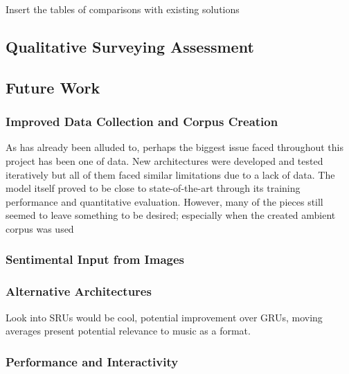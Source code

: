 \documentclass[12pt,]{article}
\begin{document}
Insert the tables of comparisons with existing solutions

\hypertarget{qualitative-surveying-assessment}{%
\subsection{Qualitative Surveying
Assessment}\label{qualitative-surveying-assessment}}

\hypertarget{future-work}{%
\subsection{Future Work}\label{future-work}}

\hypertarget{improved-data-collection-and-corpus-creation}{%
\subsubsection{Improved Data Collection and Corpus
Creation}\label{improved-data-collection-and-corpus-creation}}

As has already been alluded to, perhaps the biggest issue faced
throughout this project has been one of data. New architectures were
developed and tested iteratively but all of them faced similar
limitations due to a lack of data. The model itself proved to be close
to state-of-the-art through its training performance and quantitative
evaluation. However, many of the pieces still seemed to leave something
to be desired; especially when the created ambient corpus was used

\hypertarget{sentimental-input-from-images}{%
\subsubsection{Sentimental Input from
Images}\label{sentimental-input-from-images}}

\hypertarget{alternative-architectures}{%
\subsubsection{Alternative
Architectures}\label{alternative-architectures}}

Look into SRUs would be cool, potential improvement over GRUs, moving
averages present potential relevance to music as a format.

\hypertarget{performance-and-interactivity}{%
\subsubsection{Performance and
Interactivity}\label{performance-and-interactivity}}
\end{document}
